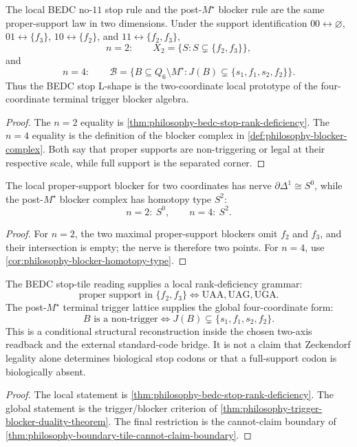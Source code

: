\begin{theorem}
\label{thm:philosophy-bedc-rank-deficiency-prototype}
The local BEDC no-$11$ stop rule and the post-$M^{\star}$ blocker rule are
the same proper-support law in two dimensions. Under the support
identification $00\leftrightarrow\varnothing$,
$01\leftrightarrow\{f_{3}\}$, $10\leftrightarrow\{f_{2}\}$, and
$11\leftrightarrow\{f_{2},f_{3}\}$,
$$
  n=2:\qquad
  X_{2}
  =
  \{S:S\subsetneq\{f_{2},f_{3}\}\},
$$
and
$$
  n=4:\qquad
  \mathcal{B}
  =
  \{B\subseteq Q_{6}\setminus M^{\star}:J(B)\subsetneq
  \{s_{1},f_{1},s_{2},f_{2}\}\}.
$$
Thus the BEDC stop L-shape is the two-coordinate local prototype of the
four-coordinate terminal trigger blocker algebra.
\end{theorem}
\begin{proof}
The $n=2$ equality is
\autoref{thm:philosophy-bedc-stop-rank-deficiency}. The $n=4$ equality is
the definition of the blocker complex in
\autoref{def:philosophy-blocker-complex}. Both say that proper supports are
non-triggering or legal at their respective scale, while full support is
the separated corner.
\end{proof}

\begin{corollary}
\label{cor:philosophy-bedc-terminal-blocker-spheres}
The local proper-support blocker for two coordinates has nerve
$\partial\Delta^{1}\cong S^{0}$, while the post-$M^{\star}$ blocker complex
has homotopy type $S^{2}$:
$$
  n=2:\ S^{0},
  \qquad
  n=4:\ S^{2}.
$$
\end{corollary}
\begin{proof}
For $n=2$, the two maximal proper-support blockers omit $f_{2}$ and
$f_{3}$, and their intersection is empty; the nerve is therefore two
points. For $n=4$, use
\autoref{cor:philosophy-blocker-homotopy-type}.
\end{proof}

\begin{theorem}
\label{thm:philosophy-bedc-rank-deficiency-theorem}
The BEDC stop-tile reading supplies a local rank-deficiency grammar:
$$
  \text{proper support in }\{f_{2},f_{3}\}
  \Longleftrightarrow
  \mathrm{UAA},\mathrm{UAG},\mathrm{UGA}.
$$
The post-$M^{\star}$ terminal trigger lattice supplies the global
four-coordinate form:
$$
  B\text{ is a non-trigger}
  \Longleftrightarrow
  J(B)\subsetneq\{s_{1},f_{1},s_{2},f_{2}\}.
$$
This is a conditional structural reconstruction inside the chosen
two-axis readback and the external standard-code bridge. It is not a
claim that Zeckendorf legality alone determines biological stop codons or
that a full-support codon is biologically absent.
\end{theorem}
\begin{proof}
The local statement is
\autoref{thm:philosophy-bedc-stop-rank-deficiency}. The global statement
is the trigger/blocker criterion of
\autoref{thm:philosophy-trigger-blocker-duality-theorem}. The final
restriction is the cannot-claim boundary of
\autoref{thm:philosophy-boundary-tile-cannot-claim-boundary}.
\end{proof}

